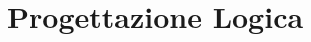 \documentclass{article}
\begin{document}




\clearpage
\section{Progettazione Logica}

%
\end{document}
